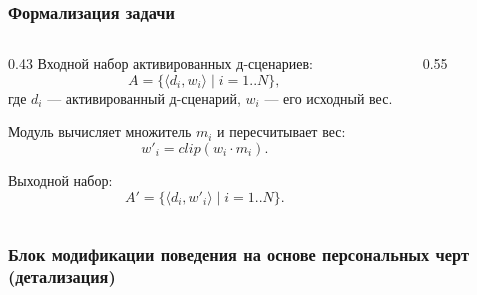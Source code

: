 \documentclass{beamer}
\begin{document}
\begin{frame}
    \frametitle{Формализация задачи}
    \begin{columns}[T]
        \begin{column}{0.43\textwidth}
            \footnotesize
            Входной набор активированных д-сценариев:
            \[
                A = \{\langle d_i, w_i \rangle \mid i = 1..N\},
            \]
            где \(d_i\) --- активированный д-сценарий, \(w_i\) --- его исходный вес.

            \vspace{0.15cm}
            Модуль вычисляет множитель \(m_i\) и пересчитывает вес:
            \[
                w'_i = clip(w_i \cdot m_i).
            \]

            \vspace{0.15cm}
            Выходной набор:
            \[
                A' = \{\langle d_i, w'_i \rangle \mid i = 1..N\}.
            \]
        \end{column}
        \begin{column}{0.55\textwidth}
            \begin{figure}
                \centering
                
            \end{figure}
        \end{column}
    \end{columns}
\end{frame}


\begin{frame}
    \frametitle{Блок модификации поведения на основе персональных черт (детализация)}
    \begin{figure}
        \centering
        
    \end{figure}
\end{frame}

\end{document}
